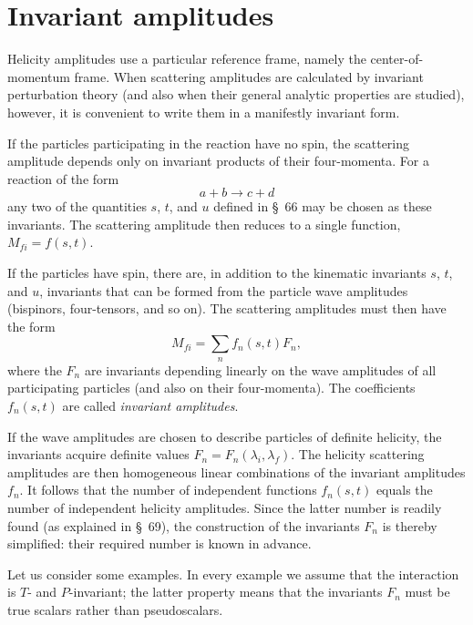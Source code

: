 \section{Invariant amplitudes}

Helicity amplitudes use a particular reference frame, namely the center-of-momentum frame. When scattering amplitudes are calculated by invariant perturbation theory (and also when their general analytic properties are studied), however, it is convenient to write them in a manifestly invariant form.

If the particles participating in the reaction have no spin, the scattering amplitude depends only on invariant products of their four-momenta. For a reaction of the form
\begin{equation}
a+b\to c+d
\tag{70.1}
\end{equation}
any two of the quantities $s$, $t$, and $u$ defined in \S~66 may be chosen as these invariants. The scattering amplitude then reduces to a single function, $M_{fi}=f(s,t)$.

If the particles have spin, there are, in addition to the kinematic invariants $s$, $t$, and $u$, invariants that can be formed from the particle wave amplitudes (bispinors, four-tensors, and so on). The scattering amplitudes must then have the form
\begin{equation}
M_{fi}=\sum_n f_n(s,t)F_n,
\tag{70.2}
\end{equation}
where the $F_n$ are invariants depending linearly on the wave amplitudes of all participating particles (and also on their four-momenta). The coefficients $f_n(s,t)$ are called \emph{invariant amplitudes}.

If the wave amplitudes are chosen to describe particles of definite helicity, the invariants acquire definite values $F_n=F_n(\lambda_i,\lambda_f)$. The helicity scattering amplitudes are then homogeneous linear combinations of the invariant amplitudes $f_n$. It follows that the number of independent functions $f_n(s,t)$ equals the number of independent helicity amplitudes. Since the latter number is readily found (as explained in \S~69), the construction of the invariants $F_n$ is thereby simplified: their required number is known in advance.

Let us consider some examples. In every example we assume that the interaction is $T$- and $P$-invariant; the latter
property means that the invariants $F_n$ must be true scalars rather than pseudoscalars.

